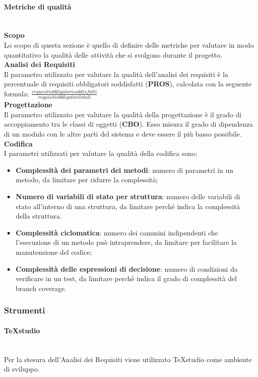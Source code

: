 \paragraph{Metriche di qualità}\mbox{}\\ [1mm]
\textbf{Scopo}\\
Lo scopo di questa sezione è quello di definire delle metriche per valutare in modo quantitativo la qualità delle attività che si svolgono durante il progetto\glo.
\\\textbf{Analisi dei Requisiti}\\
Il parametro utilizzato per valutare la qualità dell'analisi dei requisiti è la percentuale di requisiti obbligatori soddisfatti (\textbf{PROS}), calcolata con la seguente formula:
$\frac{requisiti obbligatori soddisfatti}{requisiti obbligatori totali}$
\\\textbf{Progettazione}\\
Il parametro utilizzato per valutare la qualità della progettazione è il grado di accoppiamento tra le classi di oggetti (\textbf{CBO}). Esso misura il grado di dipendenza di un modulo con le altre parti del sistema e deve essere il più basso possibile.
\\\textbf{Codifica}\\
I parametri utilizzati per valutare la qualità della codifica sono:
\begin{itemize}
	\item \textbf{Complessità dei parametri dei metodi}: numero di parametri in un metodo, da limitare per ridurre la complessità;
	\item \textbf{Numero di variabili di stato per struttura}: numero delle variabili di stato all'interno di una struttura, da limitare perché indica la complessità della struttura.
	\item \textbf{Complessità ciclomatica}: numero dei cammini indipendenti che l'esecuzione di un metodo può intraprendere, da limitare per facilitare la manutenzione del codice;
	\item \textbf{Complessità delle espressioni di decisione}: numero di condizioni da verificare in un test, da limitare perchè indica il grado di complessità del branch coverage\glo.
\end{itemize}
\subsubsection{Strumenti}
\paragraph{TeXstudio}\mbox{}\\ [1mm]
Per la stesura dell'Analisi dei Requisiti viene utilizzato TeXstudio come ambiente di sviluppo.
